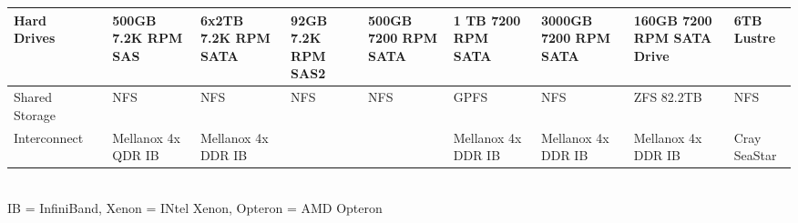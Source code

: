 \begin{sidewaystable}
\begin{footnotesize}
\begin{tabular}{|p{2cm}||p{4cm}p{1.5cm}p{1.5cm}p{1.5cm}p{1.5cm}p{1.5cm}p{1.5cm}p{1.5cm}p{1cm}|}
\hline
 Hard Drives                         && 500GB 7.2K RPM SAS & 6x2TB 7.2K RPM SATA & 92GB 7.2K RPM SAS2 & 500GB 7200 RPM SATA & 1 TB 7200 RPM SATA & 3000GB 7200 RPM SATA & 160GB 7200 RPM SATA Drive & 6TB Lustre \\
\hline
 Shared Storage                      && NFS & NFS &NFS& NFS & GPFS & NFS & ZFS 82.2TB & NFS \\
\hline
 Interconnect                        && Mellanox 4x QDR IB & Mellanox 4x DDR IB &&& Mellanox 4x DDR IB & Mellanox 4x DDR IB & Mellanox 4x DDR IB & Cray SeaStar \\
\hline
\end{tabular}
~\\
IB = InfiniBand, Xenon = INtel Xenon, Opteron = AMD Opteron 

\end{footnotesize}

\end{sidewaystable}